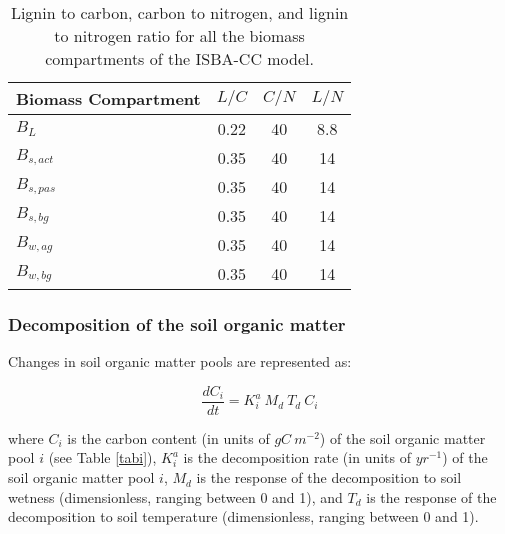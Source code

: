 {\begin{table}[htbp]
\begin{center}
\begin{tabular}{|l|c|c|c|}
\hline
Biomass Compartment      & $L/C$ & $C/N$ & $L/N$ \\
\hline
$B_L$                    & 0.22  & 40    & 8.8   \\
$B_{s,act}$              & 0.35  & 40    & 14    \\
$B_{s,pas}$              & 0.35  & 40    & 14    \\
$B_{s,bg}$               & 0.35  & 40    & 14    \\
$B_{w,ag}$               & 0.35  & 40    & 14    \\
$B_{w,bg}$               & 0.35  & 40    & 14    \\
\hline
\end{tabular}
\end{center}
\caption{\label{tabln}
         Lignin to carbon, carbon to nitrogen, and lignin to nitrogen ratio for all the 
	biomass compartments of the ISBA-CC model.}
\end{table}



\subsubsection{Decomposition of the soil organic matter}

Changes in soil organic matter pools are represented as:

\begin{equation}
\frac{dC_i}{dt} = K_i^a \: M_d \: T_d \: C_i
\end{equation}

where $C_i$ is the carbon content (in units of $gC \: m^{-2}$) 
of the soil organic matter pool $i$ (see Table \ref{tabi}),
$K_i^a$ is the decomposition rate (in units of $yr^{-1}$) of the soil organic matter pool $i$, 
$M_d$ is the response of the decomposition to soil wetness 
(dimensionless, ranging between 0 and 1),
and $T_d$ is the response of the decomposition to soil 
temperature (dimensionless, ranging between 0 and 1).

}
